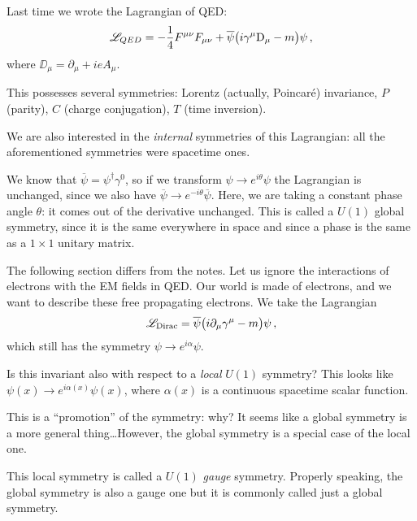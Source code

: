 \documentclass[main.tex]{subfiles}
\begin{document}

Last time we wrote the Lagrangian of QED: 
%
\begin{align}
\mathscr{L}_{QED} = - \frac{1}{4} F^{\mu \nu } F_{\mu \nu } 
+ \overline{\psi} \qty(i \gamma^{\mu } \mathrm{D}_{\mu } -m) \psi 
\,,
\end{align}
%
where \(\DD_{\mu } = \partial_{\mu } + i e A_{\mu }\).

This possesses several symmetries: Lorentz (actually, Poincaré) invariance, \(P\) (parity), \(C\) (charge conjugation), \(T\) (time inversion). 

We are also interested in the \emph{internal} symmetries of this Lagrangian: all the aforementioned symmetries were spacetime ones.

We know that \(\overline{\psi} = \psi ^\dag \gamma^{0}\), so if we transform \(\psi \to e^{i \theta } \psi \) the Lagrangian is unchanged, since we also have \(\overline{\psi} \to e^{-i \theta } \overline{\psi} \).
Here, we are taking a constant phase angle \(\theta \): it comes out of the derivative unchanged. 
This is called a \(U(1)\) global symmetry, since it is the same everywhere in space and since a phase is the same as a \(1 \times 1 \) unitary matrix.

The following section differs from the notes. 
Let us ignore the interactions of electrons with the EM fields in QED. 
Our world is made of electrons, and we want to describe these free propagating electrons. 
We take the Lagrangian 
%
\begin{align}
\mathscr{L}_{\text{Dirac}} = \overline{\psi} \qty(i \partial_{\mu } \gamma^{\mu } -m) \psi 
\,,
\end{align}
%
which still has the symmetry \(\psi \to e^{i \alpha } \psi \). 

Is this invariant also with respect to a \emph{local} \(U(1)\) symmetry? This looks like \(\psi (x) \to e^{i \alpha (x)} \psi (x)\), where \(\alpha (x)\) is a continuous spacetime scalar function. 

This is a ``promotion'' of the symmetry: why? It seems like a global symmetry is a more general thing\dots However, the global symmetry is a special case of the local one. 

This local symmetry is called a \(U(1)\) \emph{gauge} symmetry. 
Properly speaking, the global symmetry is also a gauge one but it is commonly called just a global symmetry. 
\end{document}
